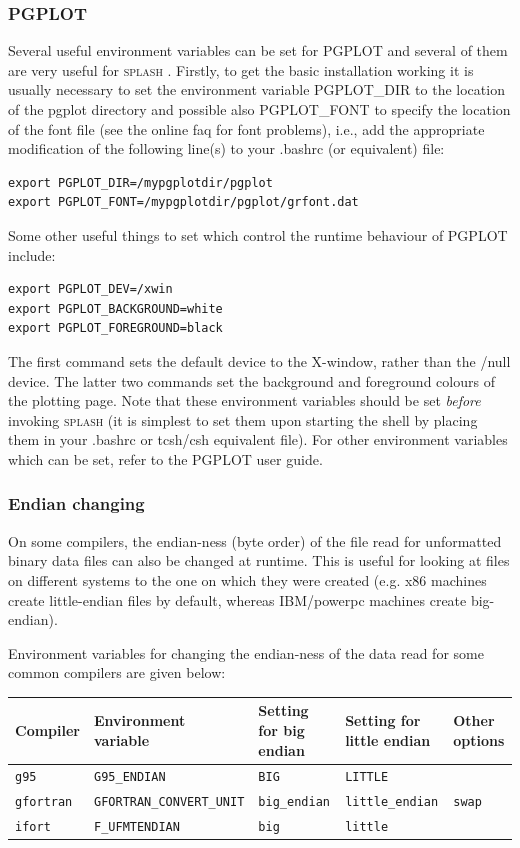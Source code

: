 \documentclass[a4paper,10pt]{article}
\newcommand{\splash}{\textsc{splash }}
\begin{document}
\subsubsection{ PGPLOT}
 Several useful environment variables can be set for PGPLOT and several of them
are very useful for \splash. Firstly, to get the basic installation working it is usually necessary to set the environment variable PGPLOT\_DIR to the location of the pgplot directory and possible also PGPLOT\_FONT to specify the location of the font file (see the online faq for font problems), i.e., add the appropriate modification of the following line(s) to your .bashrc (or equivalent) file:
\begin{verbatim}
export PGPLOT_DIR=/mypgplotdir/pgplot
export PGPLOT_FONT=/mypgplotdir/pgplot/grfont.dat
\end{verbatim}

Some other useful things to set which control the runtime behaviour of PGPLOT include:
\begin{verbatim}
export PGPLOT_DEV=/xwin
export PGPLOT_BACKGROUND=white
export PGPLOT_FOREGROUND=black
\end{verbatim}
The first command sets the default device to the X-window, rather than the /null
device. The latter two commands set the background and foreground colours of the
plotting page. Note that these environment variables should be set \emph{before}
invoking \splash (it is simplest to set them upon starting the shell by placing
them in your .bashrc or tcsh/csh equivalent file). For other environment
variables which can be set, refer to the PGPLOT user guide.

\subsubsection{ Endian changing}
 On some compilers, the endian-ness (byte order) of the file read for unformatted binary data files can also be changed at runtime. This is useful for looking at files on different systems to the one on which they were created (e.g. x86 machines create little-endian files by default, whereas IBM/powerpc machines create big-endian).

Environment variables for changing the endian-ness of the data read for some common compilers are given below:
\begin{table}[h!]
\begin{tabular}{lllll}
Compiler & Environment variable & Setting for big endian & Setting for little endian & Other options \\
\hline
\verb+g95+ & \verb+G95_ENDIAN+ & \verb+BIG+ & \verb+LITTLE+ &  \\
\verb+gfortran+ & \verb+GFORTRAN_CONVERT_UNIT+ & \verb+big_endian+ & \verb+little_endian+  & \verb+swap+ \\
\verb+ifort+ & \verb+F_UFMTENDIAN+ & \verb+big+ & \verb+little+ & \\
\hline
\end{tabular}
\end{table}
\end{document}
